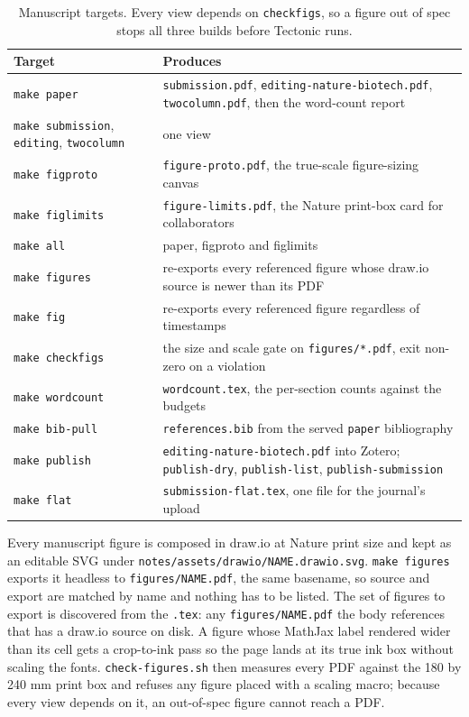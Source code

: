 \begin{table}[htbp]
\centering
\footnotesize
\caption{Manuscript targets. Every view depends on \texttt{checkfigs}, so a figure
out of spec stops all three builds before Tectonic runs.}
\label{tab:papertargets}
\begin{tabular}{lp{}}
\toprule
Target & Produces \\
\midrule
\texttt{make paper} & \texttt{submission.pdf}, \texttt{editing-nature-biotech.pdf}, \texttt{twocolumn.pdf}, then the word-count report \\
\texttt{make submission}, \texttt{editing}, \texttt{twocolumn} & one view \\
\texttt{make figproto} & \texttt{figure-proto.pdf}, the true-scale figure-sizing canvas \\
\texttt{make figlimits} & \texttt{figure-limits.pdf}, the Nature print-box card for collaborators \\
\texttt{make all} & paper, figproto and figlimits \\
\texttt{make figures} & re-exports every referenced figure whose draw.io source is newer than its PDF \\
\texttt{make fig} & re-exports every referenced figure regardless of timestamps \\
\texttt{make checkfigs} & the size and scale gate on \texttt{figures/*.pdf}, exit non-zero on a violation \\
\texttt{make wordcount} & \texttt{wordcount.tex}, the per-section counts against the budgets \\
\texttt{make bib-pull} & \texttt{references.bib} from the served \texttt{paper} bibliography \\
\texttt{make publish} & \texttt{editing-nature-biotech.pdf} into Zotero; \texttt{publish-dry}, \texttt{publish-list}, \texttt{publish-submission} \\
\texttt{make flat} & \texttt{submission-flat.tex}, one file for the journal's upload \\
\bottomrule
\end{tabular}
\end{table}

Every manuscript figure is composed in draw.io at Nature print size and kept as an
editable SVG under \texttt{notes/assets/drawio/NAME.drawio.svg}. \texttt{make
figures} exports it headless to \texttt{figures/{}NAME.pdf}, the same basename, so
source and export are matched by name and nothing has to be listed. The set of
figures to export is discovered from the \texttt{.tex}: any \texttt{figures/{}NAME.pdf}
the body references that has a draw.io source on disk. A figure whose MathJax
label rendered wider than its cell gets a crop-to-ink pass so the page lands at its
true ink box without scaling the fonts. \texttt{check-figures.sh} then measures
every PDF against the 180 by 240 mm print box and refuses any figure placed with a
scaling macro; because every view depends on it, an out-of-spec figure cannot reach
a PDF.

